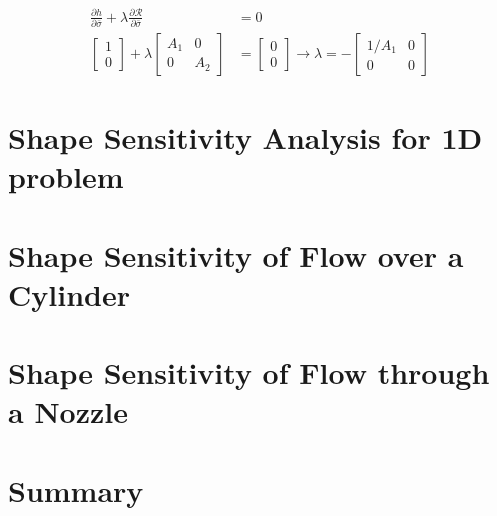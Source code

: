 \begin{align}
	\frac{\partial h}{\partial \bar{\sigma}} + \lambda \frac{\partial \mathcal{R}}{\partial \bar{\sigma}} &= 0 \nonumber \\
	\begin{bmatrix}
	1 \\
	0
	\end{bmatrix} + 
	\lambda
	\begin{bmatrix}
	A_1 & 0 \\
	0 & A_2
	\end{bmatrix}
	&=
	\begin{bmatrix}
	0 \\
	0
	\end{bmatrix} \rightarrow
	\lambda = -
	\begin{bmatrix}
	1/A_1 & 0 \\
	0 & 0
	\end{bmatrix}
\end{align}

\section{Shape Sensitivity Analysis for 1D problem}

\section{Shape Sensitivity of Flow over a Cylinder}

\section{Shape Sensitivity of Flow through a Nozzle}

\section{Summary}
